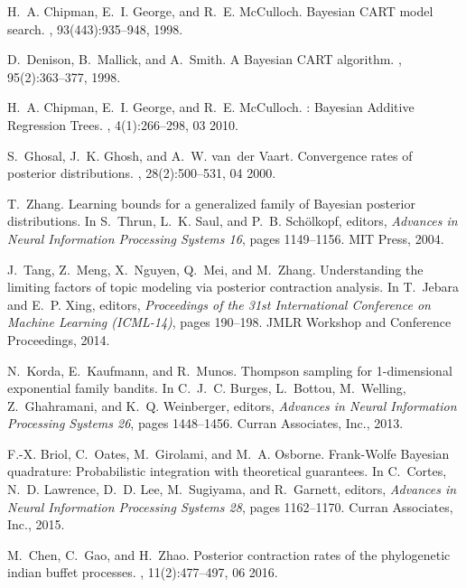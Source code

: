 \documentclass{article}
\newcommand{\1}{\mathbb{I}}
\theoremstyle{assumption}
\begin{document}
\begin{thebibliography}{10}
H.~A. Chipman, E.~I. George, and R.~E. McCulloch.
\newblock Bayesian {CART} model search.
, 93(443):935--948, 1998.

D.~Denison, B.~Mallick, and A.~Smith.
\newblock A {B}ayesian {CART} algorithm.
, 95(2):363--377, 1998.

H.~A. Chipman, E.~I. George, and R.~E. McCulloch.
: {B}ayesian {A}dditive {R}egression {T}rees.
, 4(1):266--298, 03 2010.

S.~Ghosal, J.~K. Ghosh, and A.~W. van~der Vaart.
\newblock Convergence rates of posterior distributions.
, 28(2):500--531, 04 2000.

T.~Zhang.
\newblock Learning bounds for a generalized family of {B}ayesian posterior
  distributions.
\newblock In S.~Thrun, L.~K. Saul, and P.~B. Sch\"{o}lkopf, editors, {\em
  Advances in Neural Information Processing Systems 16}, pages 1149--1156. MIT
  Press, 2004.

J.~Tang, Z.~Meng, X.~Nguyen, Q.~Mei, and M.~Zhang.
\newblock Understanding the limiting factors of topic modeling via posterior
  contraction analysis.
\newblock In T.~Jebara and E.~P. Xing, editors, {\em Proceedings of the 31st
  International Conference on Machine Learning (ICML-14)}, pages 190--198. JMLR
  Workshop and Conference Proceedings, 2014.

N.~Korda, E.~Kaufmann, and R.~Munos.
\newblock Thompson sampling for 1-dimensional exponential family bandits.
\newblock In C.~J.~C. Burges, L.~Bottou, M.~Welling, Z.~Ghahramani, and K.~Q.
  Weinberger, editors, {\em Advances in Neural Information Processing Systems
  26}, pages 1448--1456. Curran Associates, Inc., 2013.

F.-X. Briol, C.~Oates, M.~Girolami, and M.~A. Osborne.
\newblock Frank-{W}olfe {B}ayesian quadrature: Probabilistic integration with
  theoretical guarantees.
\newblock In C.~Cortes, N.~D. Lawrence, D.~D. Lee, M.~Sugiyama, and R.~Garnett,
  editors, {\em Advances in Neural Information Processing Systems 28}, pages
  1162--1170. Curran Associates, Inc., 2015.

M.~Chen, C.~Gao, and H.~Zhao.
\newblock Posterior contraction rates of the phylogenetic indian buffet
  processes.
, 11(2):477--497, 06 2016.


\end{thebibliography}
\end{document}
